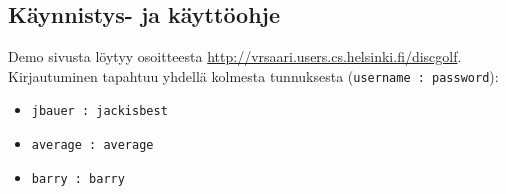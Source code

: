 \documentclass[10pt,a4paper]{article}
\begin{document}
\subsection{Käynnistys- ja käyttöohje}
Demo sivusta löytyy osoitteesta \url{http://vrsaari.users.cs.helsinki.fi/discgolf}.
Kirjautuminen tapahtuu yhdellä kolmesta tunnuksesta (\texttt{username : password}):
\begin{itemize}
\item \texttt{jbauer : jackisbest}
\item \texttt{average : average}
\item \texttt{barry : barry}
\end{itemize}
\end{document}
